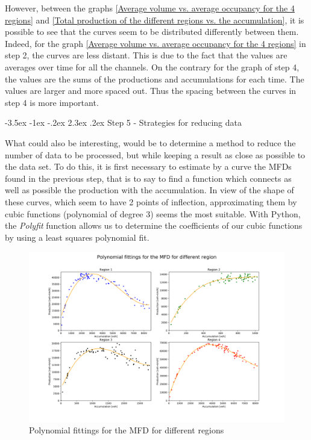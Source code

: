 \documentclass[a4paper, 12pt,oneside]{article}
\makeatletter
\renewcommand{\section}{\@startsection {section}{1}{\z@}%
             {-3.5ex \@plus -1ex \@minus -.2ex}%
             {2.3ex \@plus.2ex}%
             {\normalfont\normalsize\bfseries}}
\makeatother
\begin{document}
However, between the graphs \ref{Average volume vs. average occupancy for the 4 regions} and \ref{Total production of the different regions vs. the accumulation}, it is possible to see that the curves seem to be distributed differently between them. Indeed, for the graph \ref{Average volume vs. average occupancy for the 4 regions} in step 2, the curves are less distant. This is due to the fact that the values are averages over time for all the channels. On the contrary for the graph of step 4, the values are the sums of the productions and accumulations for each time. The values are larger and more spaced out. Thus the spacing between the curves in step 4 is more important. 

\section{Step 5 - Strategies for reducing data}

What could also be interesting, would be to determine a method to reduce the number of data to be processed, but while keeping a result as close as possible to the data set. 
\bigbreak
To do this, it is first necessary to estimate by a curve the MFDs found in the previous step, that is to say to find a function which connects as well as possible the production with the accumulation. In view of the shape of these curves, which seem to have 2 points of inflection, approximating them by cubic functions (polynomial of degree 3) seems the most suitable. With Python, the \textit{Polyfit} function allows us to determine the coefficients of our cubic functions by using a least squares polynomial fit.
\smallbreak
\begin{figure}[H]
    \begin{center}
        \includegraphics[width=18cm]{Images/Polynomial fittings for the MFD for different region.png}
        \caption{Polynomial fittings for the MFD for different regions}
        \label{Polynomial fittings for the MFD for different regions}
    \end{center}
\end{figure}
\end{document}
